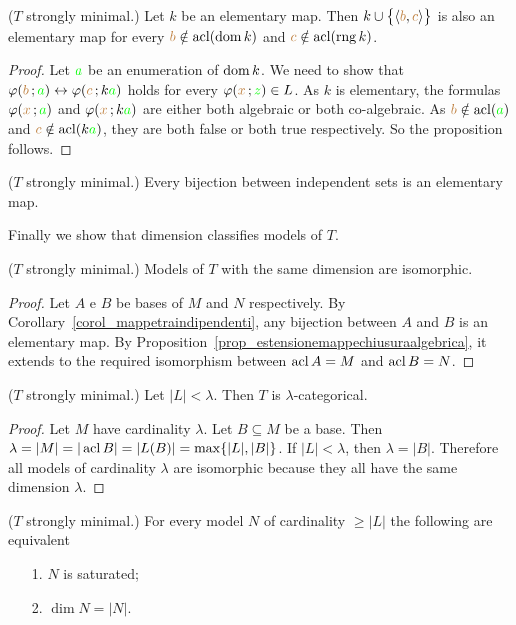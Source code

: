 \begin{proposition}\label{prop_mappetraindipendenti}
  ($T$ strongly minimal.) Let $k$ be an elementary map.
  Then $k\cup\big\{\langle{\color{brown}b},{\color{brown} c}\rangle\big\}$ is also an elementary map for every ${\color{brown} b}\notin\mathop{\rm acl}(\mathop{\rm dom} k)$ and ${\color{brown} c}\notin\mathop{\rm acl}(\mathop{\rm rng} k)$.
\end{proposition}
\begin{proof}
  Let ${\color{green} a}$ be an enumeration of $\mathop{\rm dom} k$.
  We need to show that $\varphi({\color{brown} b}\,;{\color{green} a})\leftrightarrow\varphi({\color{brown} c}\,;k{\color{green} a})$ holds for every $\varphi({\color{brown} x}\,;{\color{green} z})\in L$.
  As $k$ is elementary, the formulas $\varphi({\color{brown} x}\,;{\color{green} a})$ and $\varphi({\color{brown} x}\,;k{\color{green} a})$ are either both algebraic or both co-algebraic.
  As ${\color{brown} b}\notin\mathop{\rm acl}({\color{green} a})$ and ${\color{brown} c}\notin\mathop{\rm acl}(k{\color{green} a})$, they are both false or both true respectively.
  So the proposition follows.
\end{proof}

\begin{corollary}\label{corol_mappetraindipendenti} 
  ($T$ strongly minimal.) Every bijection between independent sets is an elementary map.\QED
\end{corollary}

Finally we show that dimension classifies models of $T$.

\begin{theorem}
  ($T$ strongly minimal.) Models of $T$ with the same dimension are isomorphic.
\end{theorem}
\begin{proof}
  Let $A$ e $B$ be bases of $M$ and $N$ respectively.
  By Corollary~\ref{corol_mappetraindipendenti}, any bijection between $A$ and $B$ is an elementary map.
  By Proposition~\ref{prop_estensionemappechiusuraalgebrica}, it extends to the required isomorphism between $\mathop{\rm acl} A=M$ and $\mathop{\rm acl} B=N$.
\end{proof}

\begin{corollary} 
  ($T$ strongly minimal.) Let $|L|<\lambda$. Then $T$ is $\lambda$-categorical.
\end{corollary}
\begin{proof}
  Let $M$ have cardinality $\lambda$. 
  Let $B\subseteq M$  be a base.
  Then $\lambda=|M|=|\mathop{\rm acl} B|=|L(B)|=\max\{|L|,|B|\}$.
  If $|L|<\lambda$, then $\lambda=|B|$.
  Therefore all models of cardinality $\lambda$ are isomorphic because they all have the same dimension $\lambda$.
\end{proof}

\begin{proposition}
  ($T$ strongly minimal.) For every model $N$ of cardinality $\ge|L|$ the following are equivalent
  \begin{itemize}
  \item[1.] $N$ is saturated;
  \item[2.] $\dim N=|N|$.
  \end{itemize}
\end{proposition}

